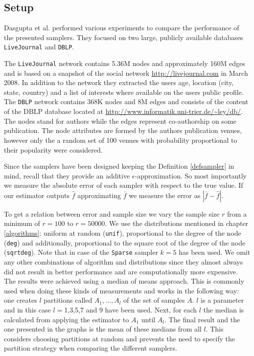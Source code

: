 \subsection{Setup}
Dasgupta et al. \cite{dasgupta2012social} performed various experiments to compare the performance of the presented samplers.
They focused on two large, publicly available databases \texttt{LiveJournal} and \texttt{DBLP}.

The \texttt{LiveJournal} network contains 5.36M nodes and approximately 160M edges and is based on a snapshot of the social network \url{http://livejournal.com} in March 2008. In addition to the network they extracted the users age, location (city, state, country) and a list of interests where available on the users public profile.
The \texttt{DBLP} network contains 368K nodes and 8M edges and consists of the content of the DBLP database located at \url{http://www.informatik.uni-trier.de/~ley/db/}. The nodes stand for authors while the edges represent co-authorship on some publication. The node attributes are formed by the authors publication venues, however only the a random set of 100 venues with probability proportional to their popularity were considered. 

Since the samplers have been designed keeping the Definition \ref{defsampler} in mind, recall that they provide an additive $\epsilon$-approximation. So most importantly we measure the absolute error of each sampler with respect to the true value. If our estimator outputs $\hat{f}$ approximating $\bar{f}$ we measure the error as $|\bar{f}-\hat{f}|$.

To get a relation between error and sample size we vary the sample size $r$ from a minimum of $r = 100$ to $r = 50000$. We use the distributions mentioned in chapter \ref{algorithms}: uniform at random (\texttt{unif}), proportional to the degree of the node (\texttt{deg}) and additionally, proportional to the square root of the degree of the node (\texttt{sqrtdeg}). Note that in case of the \texttt{Sparse} sampler $k = 5$ has been used.
We omit any other combinations of algorithm and distributions since they almost always did not result in better performance and are computationally more expensive. 
The results were achieved using a median of means approach. This is commonly used when doing these kinds of measurements and works in the following way: one creates $l$ partitions called $A_1,...,A_l$ of the set of samples $A$. $l$ is a parameter and in this case $l = $1,3,5,7 and 9 have been used. Next, for each $l$ the median is calculated from applying the estimator to $A_1$ until $A_l$. The final result and the one presented in the graphs is the mean of these medians from all $l$.
This considers choosing partitions at random and prevents the need to specify the partition strategy when comparing the different samplers.

